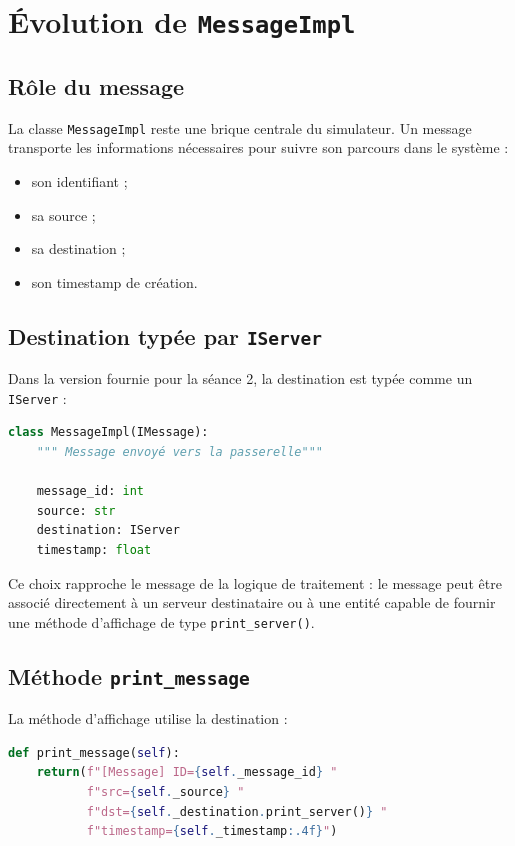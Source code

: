 \documentclass{article}
\begin{document}
\section{Évolution de \texttt{MessageImpl}}

\subsection{Rôle du message}

La classe \texttt{MessageImpl} reste une brique centrale du simulateur. Un message transporte les informations nécessaires pour suivre son parcours dans le système :
\begin{itemize}[leftmargin=*]
    \item son identifiant ;
    \item sa source ;
    \item sa destination ;
    \item son timestamp de création.
\end{itemize}

\subsection{Destination typée par \texttt{IServer}}

Dans la version fournie pour la séance 2, la destination est typée comme un \texttt{IServer} :

\begin{lstlisting}[language=Python, caption=Attributs de MessageImpl]
class MessageImpl(IMessage):
    """ Message envoyé vers la passerelle"""

    message_id: int
    source: str
    destination: IServer
    timestamp: float
\end{lstlisting}

Ce choix rapproche le message de la logique de traitement : le message peut être associé directement à un serveur destinataire ou à une entité capable de fournir une méthode d’affichage de type \texttt{print\_server()}.

\subsection{Méthode \texttt{print\_message}}

La méthode d’affichage utilise la destination :

\begin{lstlisting}[language=Python, caption=Affichage d'un message]
def print_message(self):
    return(f"[Message] ID={self._message_id} "
           f"src={self._source} "
           f"dst={self._destination.print_server()} "
           f"timestamp={self._timestamp:.4f}")
\end{lstlisting}
\end{document}
